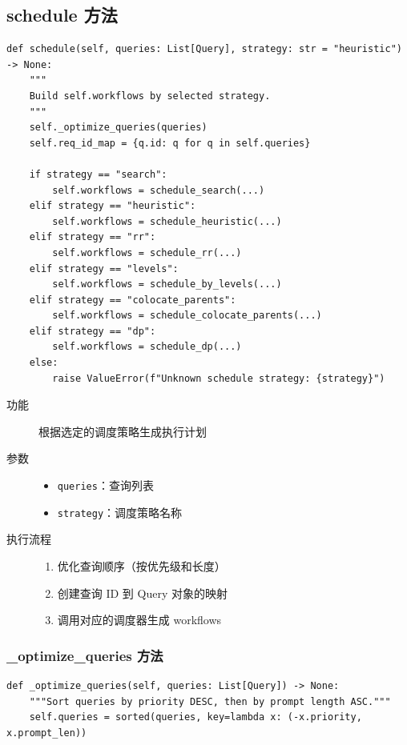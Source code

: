 \documentclass[12pt,a4paper]{article}
\begin{document}
\subsection{schedule 方法}

\begin{lstlisting}
def schedule(self, queries: List[Query], strategy: str = "heuristic") -> None:
    """
    Build self.workflows by selected strategy.
    """
    self._optimize_queries(queries)
    self.req_id_map = {q.id: q for q in self.queries}
    
    if strategy == "search":
        self.workflows = schedule_search(...)
    elif strategy == "heuristic":
        self.workflows = schedule_heuristic(...)
    elif strategy == "rr":
        self.workflows = schedule_rr(...)
    elif strategy == "levels":
        self.workflows = schedule_by_levels(...)
    elif strategy == "colocate_parents":
        self.workflows = schedule_colocate_parents(...)
    elif strategy == "dp":
        self.workflows = schedule_dp(...)
    else:
        raise ValueError(f"Unknown schedule strategy: {strategy}")
\end{lstlisting}

\begin{description}
    \item[功能] 根据选定的调度策略生成执行计划
    \item[参数]
    \begin{itemize}
        \item \texttt{queries}：查询列表
        \item \texttt{strategy}：调度策略名称
    \end{itemize}
    \item[执行流程]
    \begin{enumerate}
        \item 优化查询顺序（按优先级和长度）
        \item 创建查询 ID 到 Query 对象的映射
        \item 调用对应的调度器生成 workflows
    \end{enumerate}
\end{description}

\subsubsection{\_optimize\_queries 方法}

\begin{lstlisting}
def _optimize_queries(self, queries: List[Query]) -> None:
    """Sort queries by priority DESC, then by prompt length ASC."""
    self.queries = sorted(queries, key=lambda x: (-x.priority, x.prompt_len))
\end{lstlisting}
\end{document}
